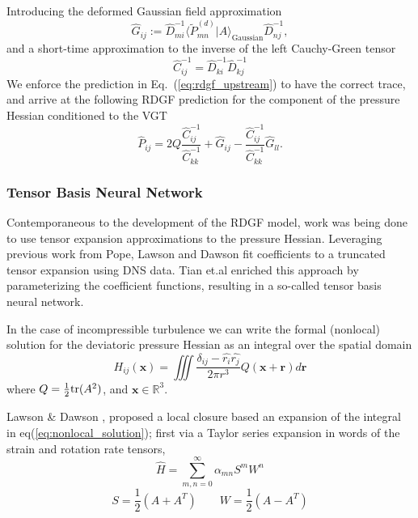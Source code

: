 Introducing the deformed Gaussian field approximation
\begin{equation}
    \hat{G}_{ij} := \hat{D}_{mi}^{-1}\langle \tilde{P}_{mn}^{(d)} | A \rangle_{\text{Gaussian}} \hat{D}_{nj}^{-1},
\end{equation}
and a short-time approximation to the inverse of the left Cauchy-Green tensor
\begin{equation}
    \hat{C}^{-1}_{ij} = \hat{D}^{-1}_{ki}\hat{D}^{-1}_{kj}
\end{equation}
We enforce the prediction in Eq.~(\ref{eq:rdgf_upstream}) to have the correct trace, and arrive at the following RDGF prediction for the component of the pressure Hessian conditioned to the VGT
\begin{equation}
    \hat{P}_{ij} = 2Q \frac{\hat{C}^{-1}_{ij}}{\hat{C}^{-1}_{kk}} + \hat{G}_{ij} - \frac{\hat{C}^{-1}_{ij}}{\hat{C}^{-1}_{kk}}\hat{G}_{ll}.
\end{equation}


\subsubsection{Tensor Basis Neural Network} \label{sec:tbnn}
Contemporaneous to the development of the RDGF model, work was being done to use tensor expansion approximations to the pressure Hessian. Leveraging previous work from Pope\cite{pope1975more}, Lawson and Dawson fit coefficients to a truncated tensor expansion using DNS data\cite{lawson2015}. Tian et.al enriched this approach by parameterizing the coefficient functions, resulting in a so-called tensor basis neural network\cite{tian2021}.

In the case of incompressible turbulence we can write the formal (nonlocal) solution for the deviatoric pressure Hessian as an integral over the spatial domain\cite{ohkitani1995}
\begin{equation} \label{eq:nonlocal_solution}
    H_{ij}({\bm x}) = \iiint \frac{\delta_{ij} - \hat{r_i}\hat{r_j}}{2\pi r^3}Q({\bm x} + {\bm r})d{\bm r}
\end{equation}
where $Q = \frac{1}{2}\text{tr}(A^2)$, and ${\bm x}\in\mathbb{R}^3$.

Lawson \& Dawson \cite{lawson2015}, proposed a local closure based an expansion of the integral in eq(\ref{eq:nonlocal_solution}); first via a Taylor series expansion in words of the strain and rotation rate tensors,
\begin{equation}
  \hat{H} = \sum_{m,n = 0}^\infty \alpha_{mn}S^mW^n
\end{equation}
\begin{equation}
  S = \frac{1}{2}(A + A^T) \qquad W = \frac{1}{2}(A - A^T)
\end{equation}

